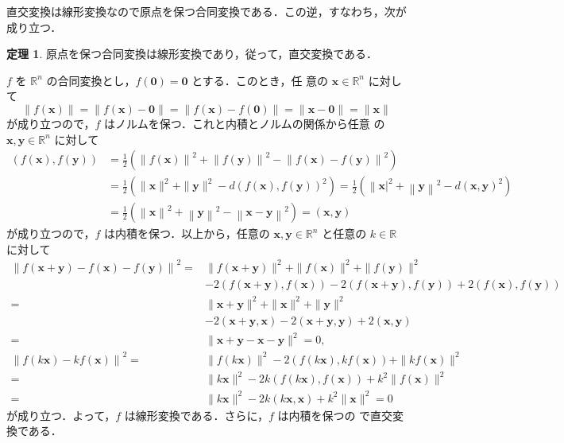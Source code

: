 \documentclass[11pt, uplatex, dvipdfmx, titlepage]{jsarticle}
\makeatletter
\renewenvironment{proof}[1][\proofname]{\par
  \pushQED{\qed}%
  \normalfont \topsep6\p@\@plus6\p@\relax
  \trivlist
  \item[\hskip\labelsep
         \bfseries
    {#1}]\ignorespaces
}{%
  \popQED\endtrivlist\@endpefalse
}
\theoremstyle{definition}
\newtheorem{theorem}{定理}[section]
\renewcommand{\proofname}{\textbf{証明}}
\makeatother
\begin{document}
直交変換は線形変換なので原点を保つ合同変換である．この逆，すなわち，次が成り立つ．

\begin{theorem}\label{thm:prev0}
  原点を保つ合同変換は線形変換であり，従って，直交変換である．
\end{theorem}

\begin{proof}
  $f$ を $\mathbb{R}^n$ の合同変換とし，$f(\bm{0}) = \bm{0}$ とする．このとき，任
  意の $\bm{x} \in \mathbb{R}^n$ に対して
  \[
    \|f(\bm{x})\| = \|f(\bm{x})-\bm{0}\| =\|f(\bm{x})-f(\bm{0})\|  = \|\bm{x}-\bm{0}\| = \| \bm{x}\|
  \]
  が成り立つので，$f$ はノルムを保つ．これと内積とノルムの関係から任意
  の $\bm{x}, \bm{y} \in \mathbb{R}^n$ に対して
  \begin{align*}
    \left(f(\bm{x}), f(\bm{y})\right)
    &= \frac{1}{2}\left( \left\|f(\bm{x})\right\|^2+\left\|f(\bm{y})\right\|^2- \left\|f(\bm{x})-f(\bm{y})\right\|^2\right)\\
    &=\frac{1}{2}\left( \|\bm{x}\|^2 + \|\bm{y}\|^2 - d\left(f(\bm{x}), f(\bm{y})\right)^2\right)
      =\frac{1}{2}\left( \left\|\bm{x}\right|^2 + \left\|\bm{y}\right\|^2 - d\left(\bm{x},\bm{y}\right)^2\right)\\
    & =\frac{1}{2}\left(\left\|\bm{x}\right\|^2+\left\|\bm{y}\right\|^2 - \left\|\bm{x}-\bm{y}\right\|^2\right)
      = \left(\bm{x}, \bm{y}\right)
  \end{align*}
  が成り立つので，$f$ は内積を保つ．以上から，任意の $\bm{x}, \bm{y}
  \in \mathbb{R}^n$ と任意の $k \in \mathbb{R}$ に対して
  \begin{align*}
    \left\|f(\bm{x}+\bm{y}) -  f(\bm{x}) - f(\bm{y}) \right\|^2
    =& \|f(\bm{x}+\bm{y})\|^2+\|f(\bm{x})\|^2+\|f(\bm{y})\|^2\\
     &- 2\left(f(\bm{x}+\bm{y}), f(\bm{x})\right)
       -2\left( f(\bm{x}+\bm{y}), f(\bm{y})\right)+2\left(f(\bm{x}), f(\bm{y})\right)\\
    =& \| \bm{x} + \bm{y}\|^2 + \|\bm{x}\|^2+\|\bm{y}\|^2\\
     &-2\left(\bm{x}+\bm{y},\bm{x}\right)-2\left(\bm{x}+\bm{y}, \bm{y}\right)+2\left(\bm{x},\bm{y}\right)\\
    =& \|\bm{x}+\bm{y} - \bm{x}-\bm{y}\|^2=0,\\
    \left\| f(k\bm{x}) - k f(\bm{x})\right\|^2  
    =& \|f(k\bm{x})\|^2-2\left( f(k\bm{x}), kf(\bm{x}) \right) + \|kf(\bm{x})\|^2\\
    =& \|k\bm{x}\|^2 - 2k\left(f(k\bm{x}), f(\bm{x})\right) + k^2\|f(\bm{x})\|^2\\
    =& \|k\bm{x}\|^2-2k\left( k\bm{x}, \bm{x}\right) + k^2 \|\bm{x}\|^2= 0
  \end{align*}
  が成り立つ．よって，$f$ は線形変換である．さらに，$f$ は内積を保つの
  で直交変換である．
\end{proof}
\end{document}

